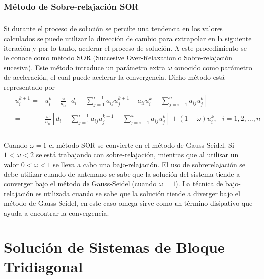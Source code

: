 \documentclass[letterpaper, openright, 12pt]{book}
\begin{document}
    \subsection{Método de Sobre-relajación SOR}
    \paragraph*{}
        Si durante el proceso de solución se percibe una tendencia en los
        valores calculados se puede utilizar la dirección de cambio para
        extrapolar en la siguiente iteración y por lo tanto, acelerar el
        proceso de solución. A este procedimiento se le conoce como método SOR
        (Succesive Over-Relaxation o  Sobre-relajación sucesiva). Este método
        introduce un parámetro extra $\omega$ conocido como parámetro de
        aceleración, el cual puede acelerar la convergencia. Dicho método está
        representado por
        \begin{align}
            &\begin{aligned}
                u_{i}^{k+1} =& u_{i}^{k} + \frac{\omega}{a_{ii}} \left[ d_{i} - \sum_{j = 1}^{i - 1}a_{ij}u_{j}^{k+1} - a_{ii}u_{i}^{k} - \sum_{j = i+1}^{n} a_{ij}u_{j}^{k} \right]
                \\ \\
                =& \frac{\omega}{a_{ii}} \left[ d_{i} - \sum_{j = 1}^{i - 1} a_{ij}u_{j}^{k+1} - \sum_{j = i+1}^{n} a_{ij}u_j ^{k}\right] + \left( 1 - \omega \right) u_{i}^{k}, &i = 1, 2, \dotsc, n
            \end{aligned}
        \end{align}
    \paragraph*{}
        Cuando $\omega = 1$ el método SOR se convierte en el método de
        Gauss-Seidel. Si $1 < \omega < 2$ se está trabajando con
        sobre-relajación, mientras que al utilizar un valor $0 < \omega < 1$ se
        lleva a cabo una bajo-relajación. El uso de sobrerelajación se debe
        utilizar cuando de antemano se sabe que la solución del sistema tiende a
        converger bajo el método de Gauss-Seidel (cuando $\omega = 1$). La
        técnica de bajo-relajación es utilizada cuando se sabe que la solución
        tiende a diverger bajo el método de Gauss-Seidel, en este caso omega
        sirve como un término disipativo que ayuda a encontrar la convergencia.

\chapter{Solución de Sistemas de Bloque Tridiagonal}\label{appTridiagonal}
\end{document}
